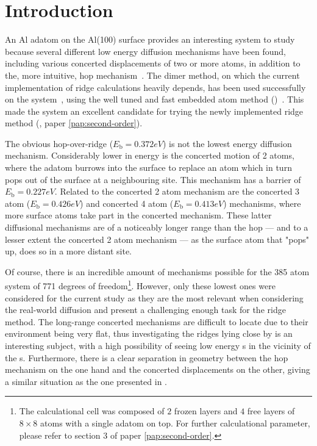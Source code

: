 \section{Introduction}
\label{sec:al-introduction}
An Al adatom on the Al(100) surface provides an interesting system to study because several different low energy diffusion mechanisms have been found, including various concerted displacements of two or more atoms, in addition to the, more intuitive, hop mechanism~\cite{concerted-motion-1990, dimer-original-1999, ts-opt-2001}.
The dimer method, on which the current implementation of ridge calculations heavily depends, has been used successfully on the system~\cite{dimer-original-1999}, using the well tuned and fast embedded atom method ()~\cite{eam-1983, eam-1986}.
This made the system an excellent candidate for trying the newly implemented ridge method (, paper \ref{pap:second-order}).

The obvious hop-over-ridge ($E_\text{b} = 0.372\unit{eV}$) is not the lowest energy diffusion mechanism.
Considerably lower in energy is the concerted motion of 2 atoms, where the adatom burrows into the surface to replace an atom which in turn pops out of the surface at a neighbouring site.
This mechanism has a barrier of $E_\text{b} = 0.227\unit{eV}$.
Related to the concerted 2 atom mechanism are the concerted 3 atom ($E_\text{b} = 0.426\unit{eV}$) and concerted 4 atom ($E_\text{b} = 0.413\unit{eV}$) mechanisms, where more surface atoms take part in the concerted mechanism.
These latter diffusional mechanisms are of a noticeably longer range than the hop --- and to a lesser extent the concerted 2 atom mechanism --- as the surface atom that "pops" up, does so in a more distant site.

Of course, there is an incredible amount of mechanisms possible for the 385 atom system of 771 degrees of freedom\footnote{The calculational cell was composed of $2$ frozen layers and $4$ free layers of $8\times 8$ atoms with a single adatom on top. For further calculational parameter, please refer to section 3 of paper \ref{pap:second-order}.}.
However, only these lowest ones were considered for the current study as they are the most relevant when considering the real-world diffusion and present a challenging enough task for the ridge method.
The long-range concerted mechanisms are difficult to locate due to their environment being very flat, thus investigating the ridges lying close by is an interesting subject, with a high possibility of seeing low energy s in the vicinity of the s.
Furthermore, there is a clear separation in geometry between the hop mechanism on the one hand and the concerted displacements on the other, giving a similar situation as the one presented in .

